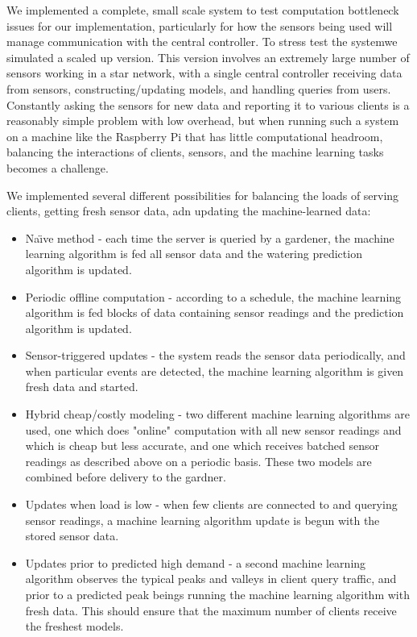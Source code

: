 \documentclass[a4paper]{acm_proc_article-sp}
\begin{document}
We implemented a complete, small scale system to test computation bottleneck issues for our implementation, particularly for how the sensors being used will manage communication with the central controller. To stress test the systemwe simulated a scaled up version. This version involves an extremely large number of sensors working in a star network, with a single central controller receiving data from sensors, constructing/updating models, and handling queries from users.  Constantly asking the sensors for new data and reporting it to various clients is a reasonably simple problem with low overhead, but when running such a system on a machine like the Raspberry Pi that has little computational headroom, balancing the interactions of clients, sensors, and the machine learning tasks becomes a challenge.

We implemented several different possibilities for balancing the loads of serving clients, getting fresh sensor data, adn updating the machine-learned data:

\begin{itemize}

\item Na\"{\i}ve method - each time the server is queried by a gardener, the machine learning algorithm is fed all sensor data and the watering prediction algorithm is updated.

\item Periodic offline computation - according to a schedule, the machine learning algorithm is fed blocks of data containing sensor readings and the prediction algorithm is updated.

\item Sensor-triggered updates - the system reads the sensor data periodically, and when particular events are detected, the machine learning algorithm is given fresh data and started.

\item Hybrid cheap/costly modeling - two different machine learning algorithms are used, one which does "online" computation with all new sensor readings and which is cheap but less accurate, and one which receives batched sensor readings as described above on a periodic basis.  These two models are combined before delivery to the gardner.

\item Updates when load is low - when few clients are connected to and querying sensor readings, a machine learning algorithm update is begun with the stored sensor data.

\item Updates prior to predicted high demand - a second machine learning algorithm observes the typical peaks and valleys in client query traffic, and prior to a predicted peak beings running the machine learning algorithm with fresh data.  This should ensure that the maximum number of clients receive the freshest models.

\end{itemize}
\end{document}
